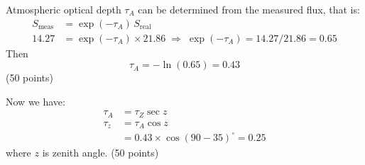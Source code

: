 Atmospheric optical depth $\tau_A$ can be determined from the measured flux,
that is:
\begin{align*}
S_{\mathrm{meas}} &= \exp(-\tau_A)\, S_{\mathrm{real}}\\
14.27 &= \exp(-\tau_A) \times 21.86
  \;\Rightarrow\; \exp(-\tau_A) = 14.27/21.86 = 0.65
\end{align*}
Then
\[ \tau_A = -\ln(0.65) = 0.43 \]
\hfill(50 points)

Now we have:
\begin{align*}
\tau_A &= \tau_Z \sec z\\
\tau_z &= \tau_A \cos z\\
       &= 0.43 \times \cos(90 - 35)^\circ = 0.25
\end{align*}
where $z$ is zenith angle. \hfill(50 points)
